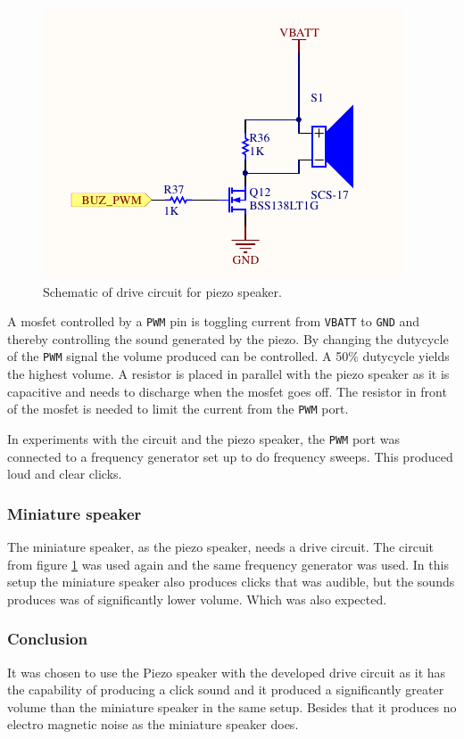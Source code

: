 \begin{figure}[h]
	\centering
	\includegraphics[width=.6\linewidth]{graphics/buzzer_circuit.pdf}
	\caption{Schematic of drive circuit for piezo speaker.}
	\label{fig:buzzer_circuit}
\end{figure}

A mosfet controlled by a \texttt{PWM} pin is toggling current from \texttt{VBATT} to \texttt{GND} and thereby controlling the sound generated by the piezo.
By changing the dutycycle of the \texttt{PWM} signal the volume produced can be controlled. 
A 50\% dutycycle yields the highest volume. 
A resistor is placed in parallel with the piezo speaker as it is capacitive and needs to discharge when the mosfet goes off.
The resistor in front of the mosfet is needed to limit the current from the \texttt{PWM} port. 

In experiments with the circuit and the piezo speaker, the \texttt{PWM} port was connected to a frequency generator set up to do frequency sweeps.
This produced loud and clear clicks.

\subsubsection*{Miniature speaker}
The miniature speaker, as the piezo speaker, needs a drive circuit. 
The circuit from figure \ref{fig:buzzer_circuit} was used again and the same frequency generator was used. 
In this setup the miniature speaker also produces clicks that was audible, but the sounds produces was of significantly lower volume.
Which was also expected.  

\subsubsection*{Conclusion}
It was chosen to use the Piezo speaker with the developed drive circuit as it has the capability of producing a click sound and it produced a significantly greater volume than the miniature speaker in the same setup. 
Besides that it produces no electro magnetic noise as the miniature speaker does. 

